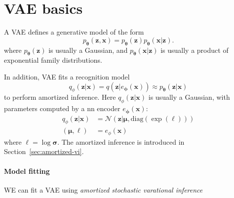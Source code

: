 \documentclass[../main.tex]{subfiles}
\begin{document}
\section{VAE basics}

A VAE defines a generative model of the form
\[
p_{\boldsymbol{\theta}}(\boldsymbol{z},\boldsymbol{x}) = p_{\boldsymbol{\theta}}(\boldsymbol{z}) p_{\boldsymbol{\theta}}(\boldsymbol{x} | \boldsymbol{z}).
\]
where $p_{\boldsymbol{\theta}}(\boldsymbol{z})$ is usually a Gaussian, and $p_{\boldsymbol{\theta}}(\boldsymbol{x} | \boldsymbol{z})$ is usually a product of exponential family distributions.

In addition, VAE fits a recognition model
\[
q_{\phi}(\boldsymbol{z} | \boldsymbol{x}) = q \left( \boldsymbol{z} | e_{\boldsymbol{\phi}}(\boldsymbol{x}) \right)  \approx p_{\boldsymbol{\theta}}(\boldsymbol{z} | \boldsymbol{x})
\]
to perform amortized inference. Here $q_{\phi}(\boldsymbol{z} | \boldsymbol{x})$ is usually a Gaussian, with parameters computed by a nn encoder $e_{\boldsymbol{\phi}}(\boldsymbol{x})$:
\[
\begin{aligned}
q_{\phi}(\boldsymbol{z} | \boldsymbol{x}) &= \mathcal{N}\left( \boldsymbol{z} | \boldsymbol{\mu}, \text{diag} \left( \exp(\boldsymbol{\ell}) \right)  \right)  \\
\left( \boldsymbol{\mu}, \boldsymbol{\ell} \right)  &= e_{\phi}(\boldsymbol{x})
\end{aligned}
\]
where $\boldsymbol{\ell} = \log \boldsymbol{\sigma}$. The amortized inference is introduced in Section~\ref{sec:amortized-vi}.

\paragraph{Model fitting}

WE can fit a VAE using \emph{amortized stochastic varational inference}










\printbibliography
\end{document}
